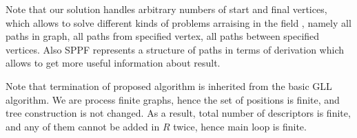 Note that our solution handles arbitrary numbers of start and final vertices, which allows to solve different kinds of problems arraising in the field
, namely all paths in graph, all paths from specified vertex, all paths between specified vertices. 
Also SPPF represents a structure of paths in terms of derivation which allows to get more useful information about result. 

Note that termination of proposed algorithm is inherited from the basic GLL algorithm.
We are process finite graphs, hence the set of positions is finite, and tree construction is not changed. 
As a result, total number of descriptors is finite, and any of them cannot be added in $R$ twice, hence main loop is finite.